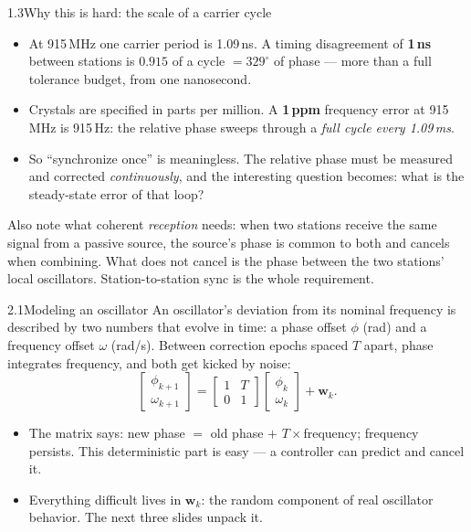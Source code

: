 \documentclass[10pt]{beamer}
\newcommand{\srcline}[1]{\par\vfill\noindent{\tiny\textcolor{gray}{Source: #1}}}
\begin{document}
\begin{frame}{1.3\quad Why this is hard: the scale of a carrier cycle}
\begin{itemize}
\item At 915\,MHz one carrier period is 1.09\,ns. A timing disagreement
of \textbf{1\,ns} between stations is $0.915$ of a cycle $=329^\circ$ of
phase --- more than a full tolerance budget, from one nanosecond.
\item Crystals are specified in parts per million. A \textbf{1\,ppm}
frequency error at 915\,MHz is 915\,Hz: the relative phase sweeps
through a \emph{full cycle every 1.09\,ms}.
\item So ``synchronize once'' is meaningless. The relative phase must be
measured and corrected \emph{continuously}, and the interesting question
becomes: what is the steady-state error of that loop?
\end{itemize}
\vspace{1ex}
Also note what coherent \emph{reception} needs: when two stations
receive the same signal from a passive source, the source's phase is
common to both and cancels when combining. What does not cancel is the
phase between the two stations' local oscillators. Station-to-station
sync is the whole requirement.
\srcline{Arithmetic from the carrier frequency; sensing observation: standard.}
\end{frame}

\begin{frame}{2.1\quad Modeling an oscillator}
An oscillator's deviation from its nominal frequency is described by two
numbers that evolve in time: a phase offset $\phi$ (rad) and a frequency
offset $\omega$ (rad/s). Between correction epochs spaced $T$ apart,
phase integrates frequency, and both get kicked by noise:
\[
\begin{bmatrix}\phi_{k+1}\\ \omega_{k+1}\end{bmatrix}
=\begin{bmatrix}1 & T\\ 0 & 1\end{bmatrix}
\begin{bmatrix}\phi_{k}\\ \omega_{k}\end{bmatrix}+\mathbf w_k .
\]
\begin{itemize}
\item The matrix says: new phase $=$ old phase $+$ $T\times$frequency;
frequency persists. This deterministic part is easy --- a controller can
predict and cancel it.
\item Everything difficult lives in $\mathbf w_k$: the random component
of real oscillator behavior. The next three slides unpack it.
\end{itemize}
\srcline{Standard clock model; used identically in [RN23] Eq.~28 and in this project.}
\end{frame}
\end{document}
